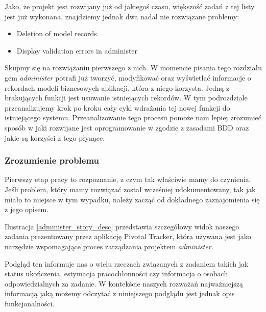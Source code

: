     Jako, że projekt jest rozwijany już od jakiegoś czasu, większość zadań z tej listy jest już wykonana, znajdziemy jednak dwa nadal nie rozwiązane problemy:
    
    \begin{itemize}
      \item Deletion of model records
      \item Display validation errors in administer
    \end{itemize}
    
    Skupmy się na rozwiązaniu pierwszego z nich. W momencie pisania tego rozdziału gem \emph{administer} potrafi już tworzyć, modyfikować oraz wyświetlać informacje o rekordach modeli biznesowych aplikacji, która z niego korzysta. Jedną z brakujących funkcji jest usuwanie istniejących rekordów. W tym podrozdziale przeanalizujemy krok po kroku cały cykl wdrażania tej nowej funkcji do istniejącego systemu. Przeanalizowanie tego procesu pomoże nam lepiej zrozumieć sposób w jaki rozwijane jest oprogramowanie w zgodzie z zasadami BDD oraz jakie są korzyści z tego płynące.
    
    \subsubsection{Zrozumienie problemu}
    Pierwszy etap pracy to rozpoznanie, z czym tak właściwie mamy do czynienia. Jeśli problem, który mamy rozwiązać został wcześniej udokumentowany, tak jak miało to miejsce w tym wypadku, należy zacząć od dokładnego zaznajomienia się z jego opisem.
    
    Ilustracja \ref{administer_story_desc} przedstawia szczegółowy widok naszego zadania prezentowany przez aplikację Pivotal Tracker, która używana jest jako narzędzie wspomagające proces zarządzania projektem \emph{administer}.
    
    Podgląd ten informuje nas o wielu rzeczach związanych z zadaniem takich jak status ukończenia, estymacja pracochłonności czy informacja o osobach odpowiedzialnych za zadanie. W kontekście naszych rozważań najważniejszą informacją jaką możemy odczytać z niniejszego podglądu jest jednak opis funkcjonalności. 
    
